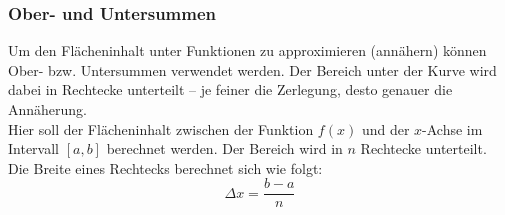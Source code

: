\subsubsection{Ober- und Untersummen}
Um den Flächeninhalt unter Funktionen zu approximieren (annähern) können Ober- bzw. Untersummen verwendet werden. Der Bereich unter der Kurve wird dabei in Rechtecke unterteilt -- je feiner die Zerlegung, desto genauer die Annäherung.
\\
Hier soll der Flächeninhalt zwischen der Funktion $f(x)$ und der $x$-Achse im Intervall $[a,b]$ berechnet werden. Der Bereich wird in $n$ Rechtecke unterteilt. Die Breite eines Rechtecks berechnet sich wie folgt: 
\begin{equation}
    \Delta x = \frac{b-a}{n}
\end{equation}
\\
\noindent

\pgfmathsetmacro{\h}{(\b-\a)/\n} %

